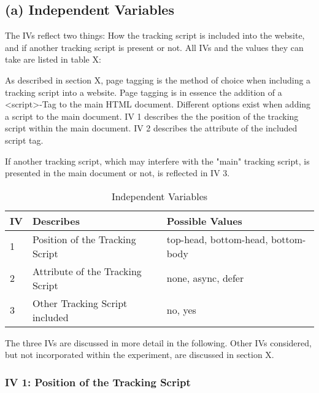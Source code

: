 


\subsection{(a) Independent Variables}


The IVs reflect two things:
How the tracking script is included into the website, and if another tracking script is present or not.
All IVs and the values they can take are listed in table X:

As described in section X, page tagging is the method of choice when including a tracking script into a website.
Page tagging is in essence the addition of a <script>-Tag to the main HTML document.
Different options exist when adding a script to the main document.
IV 1 describes the the position of the tracking script within the main document.
IV 2 describes the attribute of the included script tag.

If another tracking script, which may interfere with the "main" tracking script, is presented in the main document or not, is reflected in IV 3.

\begin{table}[h]
	\small
	\centering
	\begin{tabular}{ | l | l | l | }
	\hline
	IV \cellcolor{lightgrey} & Describes \cellcolor{lightgrey} & Possible Values \cellcolor{lightgrey} \\
	\hline
	1 & Position of the Tracking Script & top-head, bottom-head, bottom-body \\
	2 & Attribute of the Tracking Script & none, async, defer \\
	3 & Other Tracking Script included & no, yes \\
	\hline
	\end{tabular}
	\medskip
	\caption{Independent Variables}
	\label{table:independent_variables}
\end{table}


The three IVs are discussed in more detail in the following.
Other IVs considered, but not incorporated within the experiment, are discussed in section X.


\subsubsection{IV 1: Position of the Tracking Script}



